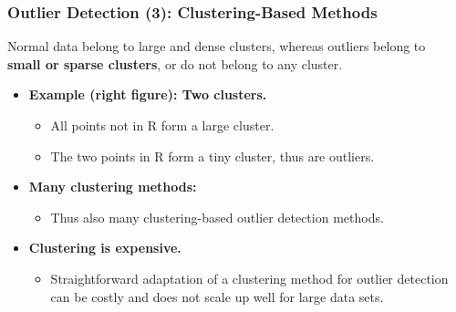 \begin{frame}
  \frametitle{Outlier Detection (3): Clustering-Based Methods}
  Normal data belong to large and dense clusters, whereas outliers belong to\\ \textbf{\color{airforceblue}small or sparse clusters}, or do not belong to any cluster.
  \begin{itemize}

  \item \textbf{Example (right figure): Two clusters.}
    \begin{itemize}
    \item All points not in R form a large cluster.
    \item The two points in R form a tiny cluster, thus are outliers.

    \end{itemize}
  \item \textbf{Many clustering methods:}
    \begin{itemize}
    \item Thus also many clustering-based outlier detection methods.
    \end{itemize}
  \item \textbf{Clustering is expensive.}
    \begin{itemize}
    \item Straightforward adaptation of a clustering method for outlier detection can be costly and does not scale up well for large data sets.
    \end{itemize}
  \end{itemize}


\end{frame}
